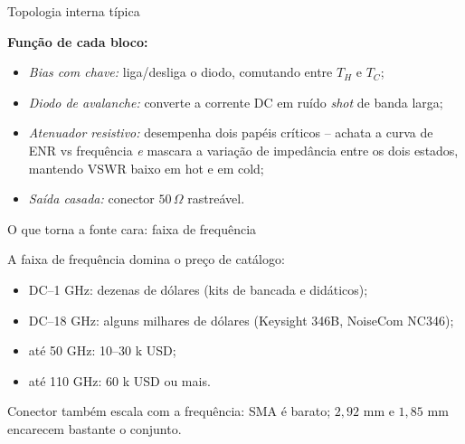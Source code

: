 
\begin{frame}{Topologia interna típica}

\begin{center}
\end{center}

\textbf{Função de cada bloco:}
\begin{itemize}
\item \emph{Bias com chave:} liga/desliga o diodo, comutando entre $T_H$ e $T_C$;
\item \emph{Diodo de avalanche:} converte a corrente DC em ruído \emph{shot} de banda larga;
\item \emph{Atenuador resistivo:} desempenha dois papéis críticos -- achata a curva de ENR vs frequência \emph{e} mascara a variação de impedância entre os dois estados, mantendo VSWR baixo em hot e em cold;
\item \emph{Saída casada:} conector $50\,\Omega$ rastreável.
\end{itemize}

\end{frame}


\begin{frame}{O que torna a fonte cara: faixa de frequência}

A faixa de frequência domina o preço de catálogo:
\begin{itemize}
\item DC--1 GHz: dezenas de dólares (kits de bancada e didáticos);
\item DC--18 GHz: alguns milhares de dólares (Keysight 346B, NoiseCom NC346);
\item até 50 GHz: 10--30 k USD;
\item até 110 GHz: 60 k USD ou mais.
\end{itemize}

Conector também escala com a frequência: SMA é barato; $2{,}92$ mm e $1{,}85$ mm encarecem bastante o conjunto.

\end{frame}

